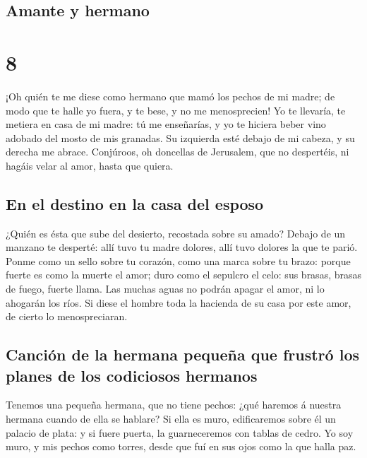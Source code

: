 \hypertarget{amante-y-hermano}{%
\subsection{Amante y hermano}\label{amante-y-hermano}}

\hypertarget{section-22-8}{%
\section{8}\label{section-22-8}}

 ¡Oh quién te me diese como hermano que mamó los pechos de
mi madre; de modo que te halle yo fuera, y te bese, y no me
menosprecien!  Yo te llevaría, te metiera en casa de mi
madre: tú me enseñarías, y yo te hiciera beber vino adobado del mosto de
mis granadas.  Su izquierda esté debajo de mi cabeza, y su
derecha me abrace.  Conjúroos, oh doncellas de Jerusalem,
que no despertéis, ni hagáis velar al amor, hasta que quiera.

\hypertarget{en-el-destino-en-la-casa-del-esposo}{%
\subsection{En el destino en la casa del
esposo}\label{en-el-destino-en-la-casa-del-esposo}}

 ¿Quién es ésta que sube del desierto, recostada sobre su
amado? Debajo de un manzano te desperté: allí tuvo tu madre dolores,
allí tuvo dolores la que te parió.  Ponme como un sello
sobre tu corazón, como una marca sobre tu brazo: porque fuerte es como
la muerte el amor; duro como el sepulcro el celo: sus brasas, brasas de
fuego, fuerte llama.  Las muchas aguas no podrán apagar el
amor, ni lo ahogarán los ríos. Si diese el hombre toda la hacienda de su
casa por este amor, de cierto lo menospreciaran.

\hypertarget{canciuxf3n-de-la-hermana-pequeuxf1a-que-frustruxf3-los-planes-de-los-codiciosos-hermanos}{%
\subsection{Canción de la hermana pequeña que frustró los planes de los
codiciosos
hermanos}\label{canciuxf3n-de-la-hermana-pequeuxf1a-que-frustruxf3-los-planes-de-los-codiciosos-hermanos}}

 Tenemos una pequeña hermana, que no tiene pechos: ¿qué
haremos á nuestra hermana cuando de ella se hablare?  Si
ella es muro, edificaremos sobre él un palacio de plata: y si fuere
puerta, la guarneceremos con tablas de cedro.  Yo soy
muro, y mis pechos como torres, desde que fuí en sus ojos como la que
halla paz.

